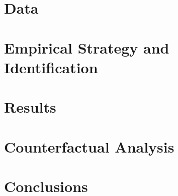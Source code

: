 \documentclass{article}
\begin{document}
\section{Data}\label{sec:data}
    

\section{Empirical Strategy and Identification}\label{sec:empirical_strategy}
    

\section{Results}\label{sec:results}
    

\section{Counterfactual Analysis}\label{sec:counterfactual}
    

\section{Conclusions}\label{sec:conclusion}
    



\clearpage
\printbibliography

\clearpage


\clearpage

\clearpage



\clearpage

\section*{}
\vspace{5mm}

\appendix

\renewcommand\thetable{\thesection.\arabic{table}}    
\renewcommand\thefigure{\thesection.\arabic{figure}} 
\setcounter{table}{0}
\setcounter{figure}{0}


\end{document}
